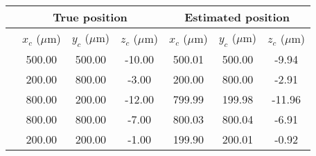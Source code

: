 
\begin{tabular}{ r c c c | c c c } 
  \toprule
  & \multicolumn{3}{c}{True position} & \multicolumn{3}{c}{Estimated position} \\
  \midrule
  & $x_c$ ($\mu$m) & $y_c$ ($\mu$m) & $z_c$ ($\mu$m) & $x_c$ ($\mu$m) & $y_c$ ($\mu$m) & $z_c$ ($\mu$m) \\
  \midrule
 & 500.00 & 500.00 & -10.00 & 500.01 & 500.00 & -9.94 \\
 & 200.00 & 800.00 & -3.00 & 200.00 & 800.00 & -2.91 \\
 & 800.00 & 200.00 & -12.00 & 799.99 & 199.98 & -11.96 \\
 & 800.00 & 800.00 & -7.00 & 800.03 & 800.04 & -6.91 \\
 & 200.00 & 200.00 & -1.00 & 199.90 & 200.01 & -0.92 \\
  \bottomrule
\end{tabular}

